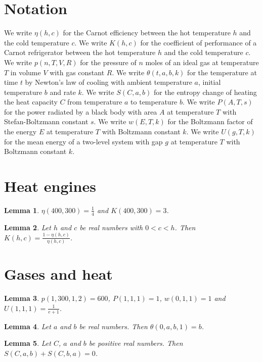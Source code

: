 \documentclass{article}
\newtheorem{lemma}{Lemma}
\begin{document}
\section{Notation}

We write $\eta(h,c)$ for the Carnot efficiency between the hot temperature $h$ and the cold temperature $c$.
We write $K(h,c)$ for the coefficient of performance of a Carnot refrigerator between the hot temperature $h$ and the cold temperature $c$.
We write $p(n,T,V,R)$ for the pressure of $n$ moles of an ideal gas at temperature $T$ in volume $V$ with gas constant $R$.
We write $\theta(t,a,b,k)$ for the temperature at time $t$ by Newton's law of cooling with ambient temperature $a$, initial temperature $b$ and rate $k$.
We write $S(C,a,b)$ for the entropy change of heating the heat capacity $C$ from temperature $a$ to temperature $b$.
We write $P(A,T,s)$ for the power radiated by a black body with area $A$ at temperature $T$ with Stefan-Boltzmann constant $s$.
We write $w(E,T,k)$ for the Boltzmann factor of the energy $E$ at temperature $T$ with Boltzmann constant $k$.
We write $U(g,T,k)$ for the mean energy of a two-level system with gap $g$ at temperature $T$ with Boltzmann constant $k$.

\section{Heat engines}

\begin{lemma}\label{carnot}
$\eta(400,300)=\frac14$ and $K(400,300)=3$.
\end{lemma}

\begin{lemma}\label{performance}
Let $h$ and $c$ be real numbers with $0<c<h$. Then $K(h,c)=\frac{1-\eta(h,c)}{\eta(h,c)}$.
\end{lemma}

\section{Gases and heat}

\begin{lemma}\label{gas}
$p(1,300,1,2)=600$, $P(1,1,1)=1$, $w(0,1,1)=1$ and $U(1,1,1)=\frac{1}{e+1}$.
\end{lemma}

\begin{lemma}\label{cooling}
Let $a$ and $b$ be real numbers. Then $\theta(0,a,b,1)=b$.
\end{lemma}

\begin{lemma}\label{entropy}
Let $C$, $a$ and $b$ be positive real numbers. Then $S(C,a,b)+S(C,b,a)=0$.
\end{lemma}
\end{document}
